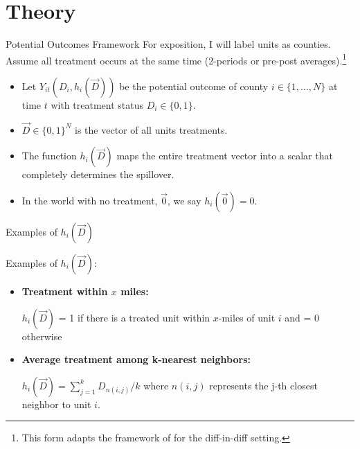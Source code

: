 \documentclass[aspectratio=43]{beamer}
\begin{document}





\section{Theory}

\begin{frame}{Potential Outcomes Framework}
    For exposition, I will label units as counties. Assume all treatment occurs at the same time (2-periods or pre-post averages).\footnote{This form adapts the framework of \citet{Vazquez-Bare_2019} for the diff-in-diff setting.}
    
    \begin{itemize}
        \item Let $Y_{it}(D_i, h_i(\vec{D}))$ be the potential outcome of county $i \in \{ 1, \dots, N \}$ at time $t$ with treatment status $D_i \in \{0, 1\}$.
        
        \item $\vec{D} \in \{0,1\}^N$ is the vector of all units treatments.
        
        \item The function $h_i(\vec{D})$ maps the entire treatment vector into a scalar that completely determines the spillover. 
        
        \item In the world with no treatment, $\vec{0}$, we say $h_i(\vec{0}) = 0$.
    \end{itemize}
\end{frame}

\begin{frame}{Examples of $h_i(\vec{D})$}
    
    Examples of $h_i(\vec{D})$:
    
    \begin{itemize}
        \item \textbf{Treatment within $x$ miles:}
        
        $h_i(\vec{D})$ = 1 if there is a treated unit within $x$-miles of unit $i$ and = 0 otherwise
            
        \item \textbf{Average treatment among k-nearest neighbors:}
        
        $h_i(\vec{D}) = \sum_{j = 1}^k D_{n(i,j)} / k$ where $n(i,j)$ represents the j-th closest neighbor to unit $i$. 


    \end{itemize}
\end{frame}
\end{document}
